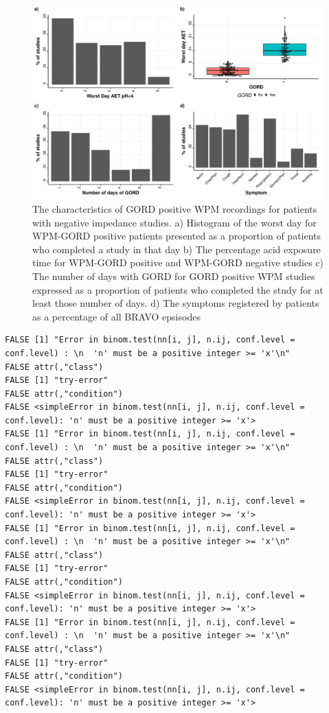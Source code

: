 \documentclass[english,man,floatsintext]{apa6}
\begin{document}
\begin{figure}

\includegraphics{TemplateReport_files/figure-latex/BRAVOdescription-1} \hfill{}

\caption{The characteristics of GORD positive WPM recordings for patients with negative impedance studies. a) Histogram of the worst day for WPM-GORD positive patients presented as a proportion of patients who completed a study in that day b) The percentage acid exposure time for WPM-GORD positive and WPM-GORD negative studies c) The number of days with GORD for GORD positive WPM studies expressed as a proportion of patients who completed the study for at least those number of days. d) The symptoms registered by patients as a percentage of all BRAVO epsisodes}\label{fig:BRAVOdescription}
\end{figure}

\begin{verbatim}
FALSE [1] "Error in binom.test(nn[i, j], n.ij, conf.level = conf.level) : \n  'n' must be a positive integer >= 'x'\n"
FALSE attr(,"class")
FALSE [1] "try-error"
FALSE attr(,"condition")
FALSE <simpleError in binom.test(nn[i, j], n.ij, conf.level = conf.level): 'n' must be a positive integer >= 'x'>
FALSE [1] "Error in binom.test(nn[i, j], n.ij, conf.level = conf.level) : \n  'n' must be a positive integer >= 'x'\n"
FALSE attr(,"class")
FALSE [1] "try-error"
FALSE attr(,"condition")
FALSE <simpleError in binom.test(nn[i, j], n.ij, conf.level = conf.level): 'n' must be a positive integer >= 'x'>
FALSE [1] "Error in binom.test(nn[i, j], n.ij, conf.level = conf.level) : \n  'n' must be a positive integer >= 'x'\n"
FALSE attr(,"class")
FALSE [1] "try-error"
FALSE attr(,"condition")
FALSE <simpleError in binom.test(nn[i, j], n.ij, conf.level = conf.level): 'n' must be a positive integer >= 'x'>
FALSE [1] "Error in binom.test(nn[i, j], n.ij, conf.level = conf.level) : \n  'n' must be a positive integer >= 'x'\n"
FALSE attr(,"class")
FALSE [1] "try-error"
FALSE attr(,"condition")
FALSE <simpleError in binom.test(nn[i, j], n.ij, conf.level = conf.level): 'n' must be a positive integer >= 'x'>
\end{verbatim}
\end{document}
